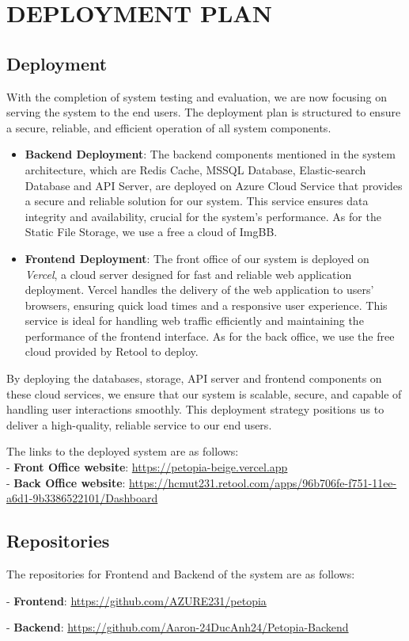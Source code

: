 \chapter{DEPLOYMENT PLAN}

\section{Deployment}

With the completion of system testing and evaluation, we are now focusing on serving the system to the end users. The deployment plan is structured to ensure a secure, reliable, and efficient operation of all system components.

\begin{itemize}
    \item \textbf{Backend Deployment}: The backend components mentioned in the system architecture,
    which are Redis Cache, MSSQL Database, Elastic-search Database and API Server,
    are deployed on Azure Cloud Service that provides a secure and 
    reliable solution for our system. This service ensures data integrity and availability, crucial for the system’s performance.
    As for the Static File Storage, we use a free a cloud of ImgBB.
    \item \textbf{Frontend Deployment}: The front office of our system is deployed on \textit{Vercel}, a cloud server designed for fast and reliable web application deployment. Vercel handles the delivery of the web application to users' browsers, ensuring quick load times and a responsive user experience. This service is ideal for handling web traffic efficiently and maintaining the performance of the frontend interface.
    As for the back office, we use the free cloud provided by Retool to deploy.
\end{itemize}

By deploying the databases, storage, API server and frontend components on these cloud services, we ensure that our system is scalable, secure, and capable of handling user interactions smoothly. This deployment strategy positions us to deliver a high-quality, reliable service to our end users.

The links to the deployed system are as follows:\\
- \textbf{Front Office website}: \url{https://petopia-beige.vercel.app}\\
- \textbf{Back Office website}: \url{https://hcmut231.retool.com/apps/96b706fe-f751-11ee-a6d1-9b3386522101/Dashboard}
\section{Repositories}

The repositories for Frontend and Backend of the system are as follows:

- \textbf{Frontend}: \url{https://github.com/AZURE231/petopia}

- \textbf{Backend}: \url{https://github.com/Aaron-24DucAnh24/Petopia-Backend}
